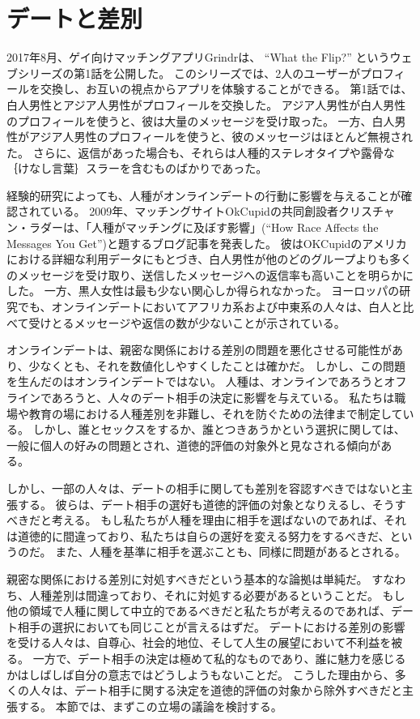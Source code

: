\documentclass[paper=a4,book,openany]{jlreq}
\begin{document}
\section{デートと差別}

2017年8月、ゲイ向けマッチングアプリ{Grindr}は、 ``What the Flip?'' というウェブシリーズの第1話を公開した。
このシリーズでは、2人のユーザーがプロフィールを交換し、お互いの視点からアプリを体験することができる。
第1話では、白人男性とアジア人男性がプロフィールを交換した。
アジア人男性が白人男性のプロフィールを使うと、彼は大量のメッセージを受け取った。
一方、白人男性がアジア人男性のプロフィールを使うと、彼のメッセージはほとんど無視された。
さらに、返信があった場合も、それらは人種的ステレオタイプや露骨な｛けなし言葉｝{スラー}を含むものばかりであった\citep{wong17:_watch_what_happen_when_these}。

経験的研究によっても、人種がオンラインデートの行動に影響を与えることが確認されている。
2009年、マッチングサイトOkCupidの共同創設者クリスチャン・ラダーは、「人種がマッチングに及ぼす影響」(``How Race Affects the Messages You Get'')と題するブログ記事を発表した。
彼はOKCupidのアメリカにおける詳細な利用データにもとづき、白人男性が他のどのグループよりも多くのメッセージを受け取り、送信したメッセージへの返信率も高いことを明らかにした。
一方、黒人女性は最も少ない関心しか得られなかった\citep[pp.101-109]{rudder14:_datac}。
ヨーロッパの研究でも、オンラインデートにおいてアフリカ系および中東系の人々は、白人と比べて受けとるメッセージや返信の数が少ないことが示されている\citep[p.332]{potarca15:_racial_prefer_onlin_datin_europ_count}。

オンラインデートは、親密な関係における差別の問題を悪化させる可能性があり、少なくとも、それを数値化しやすくしたことは確かだ。
しかし、この問題を生んだのはオンラインデートではない。
人種は、オンラインであろうとオフラインであろうと、人々のデート相手の決定に影響を与えている。
私たちは職場や教育の場における人種差別を非難し、それを防ぐための法律まで制定している。
しかし、誰とセックスをするか、誰とつきあうかという選択に関しては、一般に個人の好みの問題とされ、道徳的評価の対象外と見なされる傾向がある。

しかし、一部の人々は、デートの相手に関しても差別を容認すべきではないと主張する。
彼らは、デート相手の選好も道徳的評価の対象となりえるし、そうすべきだと考える。
もし私たちが人種を理由に相手を選ばないのであれば、それは道徳的に間違っており、私たちは自らの選好を変える努力をするべきだ、というのだ。
また、人種を基準に相手を選ぶことも、同様に問題があるとされる。

親密な関係における差別に対処すべきだという基本的な論拠は単純だ。
すなわち、人種差別は間違っており、それに対処する必要があるということだ。
もし他の領域で人種に関して中立的であるべきだと私たちが考えるのであれば、デート相手の選択においても同じことが言えるはずだ。
デートにおける差別の影響を受ける人々は、自尊心、社会的地位、そして人生の展望において不利益を被る。
一方で、デート相手の決定は極めて私的なものであり、誰に魅力を感じるかはしばしば自分の意志ではどうしようもないことだ。
こうした理由から、多くの人々は、デート相手に関する決定を道徳的評価の対象から除外すべきだと主張する。
本節では、まずこの立場の議論を検討する。
\end{document}
